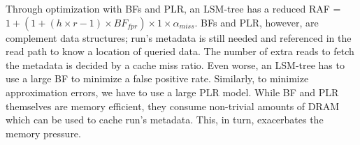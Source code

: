 \begin{comment}
BF and PLR are effective in reducing RAF.  With BFs, $r \times h$ reduces to
1 + ($r \times h \times BF_{fpr}$), where $BF_{fpr}$ is a false positive rate of BFs
($0<BF_{fpr}<1$).  When PLR is combined, the number of I/Os to fetch run's
metadata reduces greatly, along with lookup complexity. \polish{If a search
range suggested by PLR fits in a single sector}, $log_{2}(m)$ reduces to 1.  The
new RAF is thus as follow: RAF = $1 + ( h \times r \times BF_{fpr} \times 1) \times (1 -
\alpha_{hit})$.
\end{comment}

Through optimization with BFs and PLR, 
an LSM-tree has a reduced RAF 
= $1 + (1 + (h \times r -1) \times BF_{fpr}) \times 1 \times \alpha_{miss}$.
BFs and PLR, however, are complement data structures; run's metadata is still
needed and referenced in the read path to know a location of queried data.
The number of extra reads to fetch the metadata is decided by a
cache miss ratio.  Even worse,
an LSM-tree has to use a large BF to minimize a false positive rate.  
Similarly, to minimize approximation errors, 
we have to use a large PLR model.
While BF and PLR themselves are memory efficient, they consume non-trivial
amounts of DRAM which can be used to cache run's metadata.
This, in turn, exacerbates the memory pressure.






